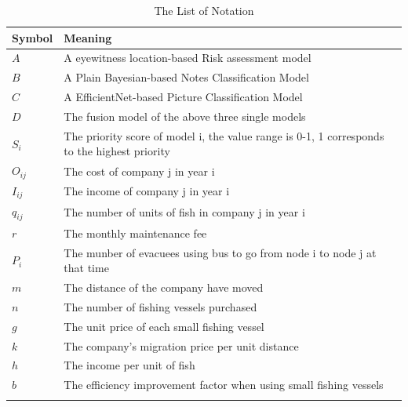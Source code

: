 \documentclass{mcmthesis}
\numberwithin{figure}{section}
\numberwithin{table}{section}
\begin{document}
\begin{center}
\begin{longtable}{p{}p{}m{}}
\caption{The List of Notation}\\
\hline
Symbol& Meaning \\
\hline

$A$      & A eyewitness location-based Risk assessment model
                                                         \\
$B$      & A Plain Bayesian-based Notes Classification Model
                                                          \\
$C$     & A EfficientNet-based Picture Classification Model
                                                        \\
$D$       & The fusion model of the above three single models                                                       \\
$S_i$      & The priority score of model i, the value range is 0-1, 1 corresponds to the highest priority
                                                            \\
$O_{ij}$       & The cost of company j in year i                                  \\
$I_{ij}$       & The income of company j in year i                                         \\
$q_{ij}$       & The number of units of fish in company j in year i
\\
$r$       & The monthly maintenance fee \\
$P_i$       & The munber of evacuees using bus to go from node i to node j at that time \\
$m$      & The distance of the company have moved                                                            \\
$n$       & The number of fishing vessels purchased                      \\
$g$       & The unit price of each small fishing vessel                     \\
$k$       & The company's migration price per unit distance
\\
$h$       & The income per unit of fish                                                                \\
$b$       & The efficiency improvement factor when using small fishing vessels                         \\
                                                        \\ \hline

 \end{longtable}
 \end{center}
\end{document}
